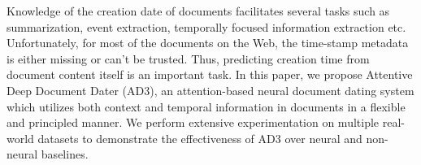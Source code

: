 Knowledge of the creation date of documents facilitates several tasks such as summarization, event extraction, temporally focused information extraction etc. Unfortunately, for most of the documents on the Web, the time-stamp metadata is either missing or can't be trusted. Thus, predicting creation time from document content itself is an important task. In this paper, we propose Attentive Deep Document Dater (AD3), an attention-based neural document dating system which utilizes both context and temporal information in documents in a flexible and principled manner. We perform extensive experimentation on multiple real-world datasets to demonstrate the effectiveness of AD3 over neural and non-neural baselines.
